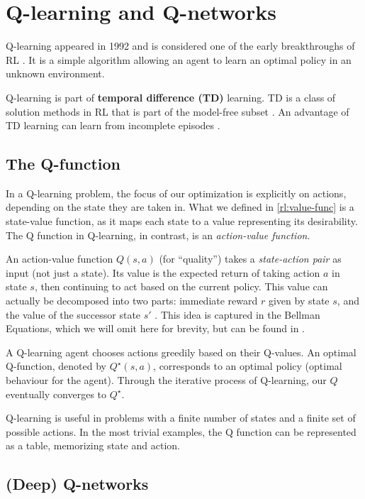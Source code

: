 \section{Q-learning and Q-networks}

Q-learning \cite{Watkins1992} appeared in 1992 and is considered one of the early breakthroughs of RL \cite{rlai}.
It is a simple algorithm allowing an agent to learn an optimal policy in an unknown environment.

Q-learning is part of \textbf{temporal difference (TD)} learning.
TD is a class of solution methods in RL that is part of the model-free subset \cite{rlai}.
An advantage of TD learning can learn from incomplete episodes \cite{long-peak-rl}.

\subsection{The Q-function}
In a Q-learning problem, the focus of our optimization is explicitly on actions, depending on the state they are taken in.
What we defined in \ref{rl:value-func} is a state-value function, as it maps each state to a value representing its desirability.
The Q function in Q-learning, in contrast, is an \emph{action-value function}.

An action-value function \(Q(s, a)\) (for ``quality'') takes a \emph{state-action pair} as input (not just a state).
Its value is the expected return of taking action \(a\) in state \(s\), then continuing to act based on the current policy.
This value can actually be decomposed into two parts: immediate reward \(r\) given by state \(s\), and the value of the successor state \({s}'\) \cite{silver-lectures}.
This idea is captured in the Bellman Equations, which we will omit here for brevity, but can be found in \cite{rlai, silver-lectures}.

A Q-learning agent chooses actions greedily based on their Q-values.
An optimal Q-function, denoted by  \(Q^{\star}(s, a)\), corresponds to an optimal policy (optimal behaviour for the agent).
Through the iterative process of Q-learning, our \(Q\) eventually converges to \(Q^{\star}\).

Q-learning is useful in problems with a finite number of states and a finite set of possible actions.
In the most trivial examples, the Q function can be represented as a table, memorizing state and action.

\subsection{(Deep) Q-networks}

